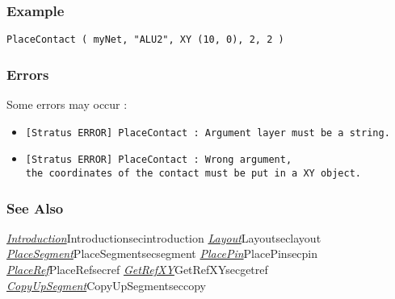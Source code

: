 \subsubsection{Example}

\begin{verbatim}
PlaceContact ( myNet, "ALU2", XY (10, 0), 2, 2 )
\end{verbatim}

\subsubsection{Errors}
    
Some errors may occur :
\begin{itemize}
    \item \verb-[Stratus ERROR] PlaceContact : Argument layer must be a string.-
    \item \verb-[Stratus ERROR] PlaceContact : Wrong argument,-\\\verb-the coordinates of the contact must be put in a XY object.-
\end{itemize}

\begin{htmlonly}

\subsubsection{See Also}

\hyperref[ref]{\emph{Introduction}}{}{Introduction}{secintroduction}
\hyperref[ref]{\emph{Layout}}{}{Layout}{seclayout}
\hyperref[ref]{\emph{PlaceSegment}}{}{PlaceSegment}{secsegment}
\hyperref[ref]{\emph{PlacePin}}{}{PlacePin}{secpin}
\hyperref[ref]{\emph{PlaceRef}}{}{PlaceRef}{secref}
\hyperref[ref]{\emph{GetRefXY}}{}{GetRefXY}{secgetref}
\hyperref[ref]{\emph{CopyUpSegment}}{}{CopyUpSegment}{seccopy}

\end{htmlonly}
